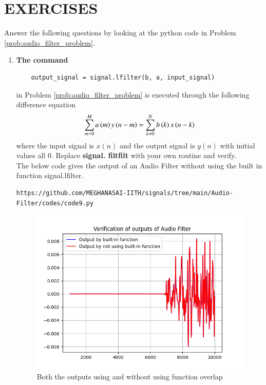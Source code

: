 \documentclass[journal,12pt,twocolumn]{IEEEtran}
\theoremstyle{remark}
\begin{document}
\section{EXERCISES}
\noindent Answer the following questions by looking at the python code in Problem \ref{prob:audio_filter_problem}.
\begin{enumerate}[label=\thesection.\arabic*,ref=\thesection.\theenumi]
\item
\textbf{The command}
\begin{lstlisting}
	output_signal = signal.lfilter(b, a, input_signal)
	\end{lstlisting}
in Problem \ref{prob:audio_filter_problem} is executed through the following difference equation
\begin{equation}
\label{eq:iir_filter_gen}
 \sum _{m=0}^{M}a\left(m\right)y\left(n-m\right)=\sum _{k=0}^{N}b\left(k\right)x\left(n-k\right) 
\end{equation}
%
where the input signal is $x(n)$ and the output signal is $y(n)$ with initial values all 0. Replace
\textbf{signal. filtfilt} with your own routine and verify.\\

\solution The below code gives the output of an Audio Filter without using the built in function signal.lfilter.
\begin{lstlisting}
https://github.com/MEGHANASAI-IITH/signals/tree/main/Audio-Filter/codes/code9.py
\end{lstlisting}
\begin{figure}[H]
\centering
\includegraphics[width=\columnwidth]{figs/Audio_Filter_verf.png}
\caption{Both the outputs using and without using function overlap}
\label{fig:6.1}
\end{figure}


\end{enumerate}
\end{document}

